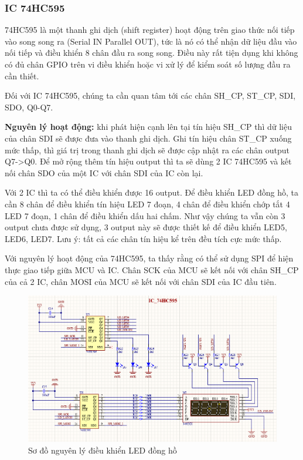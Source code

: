 \subsubsection{IC 74HC595}
74HC595 là một thanh ghi dịch (shift register) hoạt động trên giao thức nối tiếp vào song song ra (Serial IN Parallel OUT), tức là nó có thể nhận dữ liệu đầu vào nối tiếp và điều khiển 8 chân đầu ra song song. Điều này rất tiện dụng khi không có đủ chân GPIO trên vi điều khiển hoặc vi xử lý để kiểm soát số lượng đầu ra cần thiết.

Đối với IC 74HC595, chúng ta cần quan tâm tới các chân SH\_CP, ST\_CP, SDI, SDO, Q0-Q7.

\textbf{Nguyên lý hoạt động:} khi phát hiện cạnh lên tại tín hiệu SH\_CP thì dữ liệu của chân SDI sẽ được đưa vào thanh ghi dịch. Ghi tín hiệu chân ST\_CP xuống mức thấp, thì giá trị trong thanh ghi dịch sẽ được cập nhật ra các chân output Q7->Q0. Để mở rộng thêm tín hiệu output thì ta sẽ dùng 2 IC 74HC595 và kết nối chân SDO của một IC với chân SDI của IC còn lại.

Với 2 IC thì ta có thể điều khiển được 16 output. Để điều khiển LED đồng hồ, ta cần 8 chân để điều khiển tín hiệu LED 7 đoạn, 4 chân để điều khiển chớp tắt 4 LED 7 đoạn, 1 chân để điều khiển dấu hai chấm. Như vậy chúng ta vẫn còn 3 output chưa được sử dụng, 3 output này sẽ được thiết kế để điều khiển LED5, LED6, LED7. Lưu ý: tất cả các chân tín hiệu kể trên đều tích cực mức thấp.

\newpage

Với nguyên lý hoạt động của 74HC595, ta thấy rằng có thể sử dụng SPI để hiện thực giao tiếp giữa MCU và IC. Chân SCK của MCU sẽ kết nối với chân SH\_CP của cả 2 IC, chân MOSI của MCU sẽ kết nối với chân SDI của IC đầu tiên.

\begin{figure}[ht]
    \centering
    \includegraphics[width=\textwidth]{graphics/sche.PNG}
    \caption{Sơ đồ nguyên lý điều khiển LED đồng hồ}
\end{figure}